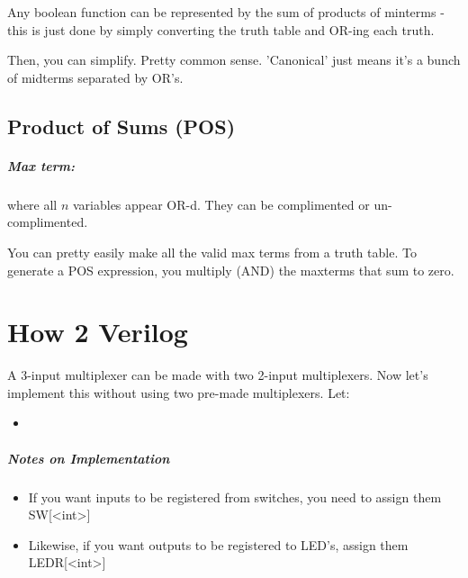 \documentclass[a4paper,12pt]{report}
\begin{document}
Any boolean function can be represented by the sum of products of minterms - this is just done 
by simply converting the truth table and OR-ing each truth. 

Then, you can simplify. Pretty common sense. 'Canonical' just means it's a bunch of midterms
separated by OR's.

\section{Product of Sums (POS)}
\paragraph{Max term: } where all $n$ variables appear OR-d. They can be complimented or
un-complimented. 

You can pretty easily make all the valid max terms from a truth table. To generate a POS
expression, you multiply (AND) the maxterms that sum to zero. 





\chapter{How 2 Verilog}
A 3-input multiplexer can be made with two 2-input multiplexers.
Now let's implement this without using two pre-made multiplexers. Let:
\begin{itemize}
\item 
\end{itemize}

\paragraph{Notes on Implementation}
\begin{itemize}
\item If you want inputs to be registered from switches, you need to assign them SW[<int>]
\item Likewise, if you want outputs to be registered to LED's, assign them LEDR[<int>]
\end{itemize}
\end{document}
